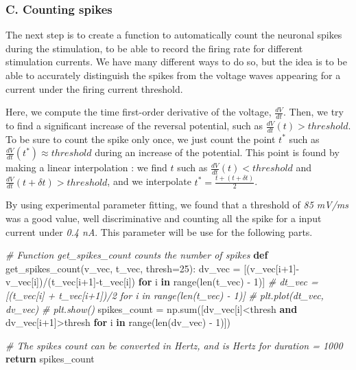 \documentclass[]{article}
\newenvironment{Shaded}{}{}
\newcommand{\BuiltInTok}[1]{#1}
\newcommand{\CommentTok}[1]{\textcolor[rgb]{0.38,0.63,0.69}{\textit{#1}}}
\newcommand{\ControlFlowTok}[1]{\textcolor[rgb]{0.00,0.44,0.13}{\textbf{#1}}}
\newcommand{\DecValTok}[1]{\textcolor[rgb]{0.25,0.63,0.44}{#1}}
\newcommand{\KeywordTok}[1]{\textcolor[rgb]{0.00,0.44,0.13}{\textbf{#1}}}
\newcommand{\NormalTok}[1]{#1}
\newcommand{\OperatorTok}[1]{\textcolor[rgb]{0.40,0.40,0.40}{#1}}
\begin{document}
\hypertarget{c.-counting-spikes}{%
\subsubsection{C. Counting spikes}\label{c.-counting-spikes}}

The next step is to create a function to automatically count the
neuronal spikes during the stimulation, to be able to record the firing
rate for different stimulation currents. We have many different ways to
do so, but the idea is to be able to accurately distinguish the spikes
from the voltage waves appearing for a current under the firing current
threshold.

Here, we compute the time first-order derivative of the voltage,
\(\frac{dV}{dt}\). Then, we try to find a significant increase of the
reversal potential, such as \(\frac{dV}{dt}(t) > threshold\). To be sure
to count the spike only once, we just count the point \(t^*\) such as
\(\frac{dV}{dt}(t^*) \approx threshold\) during an increase of the
potential. This point is found by making a linear interpolation : we
find \(t\) such as \(\frac{dV}{dt}(t) < threshold\) and
\(\frac{dV}{dt}(t + \delta t) > threshold\), and we interpolate
\(t^* = \frac{t + (t+\delta t)}{2}\).

By using experimental parameter fitting, we found that a threshold of
\emph{85 mV/ms} was a good value, well discriminative and counting all
the spike for a input current under \emph{0.4 nA}. This parameter will
be use for the following parts.

\begin{Shaded}
\begin{Highlighting}[]
\CommentTok{# Function get_spikes_count counts the number of spikes }
\KeywordTok{def}\NormalTok{ get_spikes_count(v_vec, t_vec, thresh}\OperatorTok{=}\DecValTok{25}\NormalTok{): }
\NormalTok{    dv_vec }\OperatorTok{=}\NormalTok{ [(v_vec[i}\OperatorTok{+}\DecValTok{1}\NormalTok{]}\OperatorTok{-}\NormalTok{v_vec[i])}\OperatorTok{/}\NormalTok{(t_vec[i}\OperatorTok{+}\DecValTok{1}\NormalTok{]}\OperatorTok{-}\NormalTok{t_vec[i]) }\ControlFlowTok{for}\NormalTok{ i }\KeywordTok{in} \BuiltInTok{range}\NormalTok{(}\BuiltInTok{len}\NormalTok{(t_vec) }\OperatorTok{-} \DecValTok{1}\NormalTok{)]}
    \CommentTok{# dt_vec = [(t_vec[i] + t_vec[i+1])/2 for i in range(len(t_vec) - 1)]}
    \CommentTok{# plt.plot(dt_vec, dv_vec)}
    \CommentTok{# plt.show()}
\NormalTok{    spikes_count }\OperatorTok{=}\NormalTok{ np.}\BuiltInTok{sum}\NormalTok{([dv_vec[i]}\OperatorTok{<}\NormalTok{thresh }\KeywordTok{and}\NormalTok{ dv_vec[i}\OperatorTok{+}\DecValTok{1}\NormalTok{]}\OperatorTok{>}\NormalTok{thresh }\ControlFlowTok{for}\NormalTok{ i }\KeywordTok{in} \BuiltInTok{range}\NormalTok{(}\BuiltInTok{len}\NormalTok{(dv_vec) }\OperatorTok{-} \DecValTok{1}\NormalTok{)])}
    
    \CommentTok{# The spikes count can be converted in Hertz, and is Hertz for duration = 1000}
    \ControlFlowTok{return}\NormalTok{ spikes_count}
\end{Highlighting}
\end{Shaded}
\end{document}

